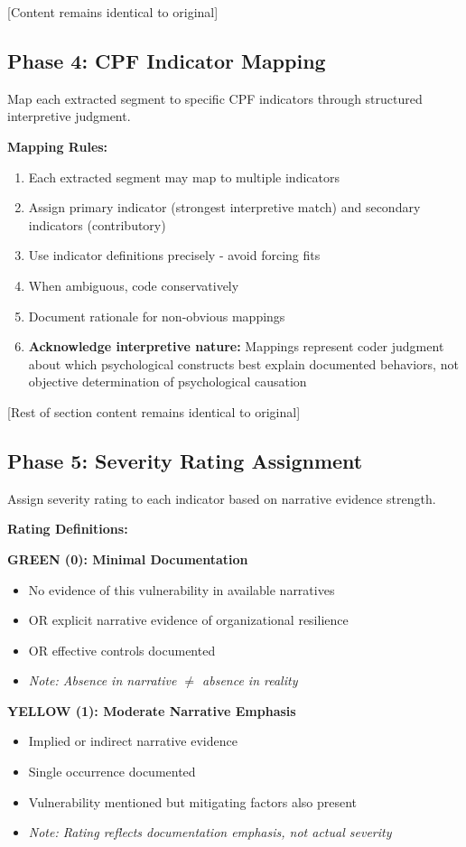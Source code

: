 \documentclass[11pt,a4paper]{article}
\begin{document}
[Content remains identical to original]

\subsection{Phase 4: CPF Indicator Mapping}

Map each extracted segment to specific CPF indicators through structured interpretive judgment.

\textbf{Mapping Rules:}

\begin{enumerate}
\item Each extracted segment may map to multiple indicators
\item Assign primary indicator (strongest interpretive match) and secondary indicators (contributory)
\item Use indicator definitions precisely - avoid forcing fits
\item When ambiguous, code conservatively
\item Document rationale for non-obvious mappings
\item \textbf{Acknowledge interpretive nature:} Mappings represent coder judgment about which psychological constructs best explain documented behaviors, not objective determination of psychological causation
\end{enumerate}

[Rest of section content remains identical to original]

\subsection{Phase 5: Severity Rating Assignment}

Assign severity rating to each indicator based on narrative evidence strength.

\textbf{Rating Definitions:}

\textbf{GREEN (0): Minimal Documentation}
\begin{itemize}
\item No evidence of this vulnerability in available narratives
\item OR explicit narrative evidence of organizational resilience
\item OR effective controls documented
\item \textit{Note: Absence in narrative $\neq$ absence in reality}
\end{itemize}

\textbf{YELLOW (1): Moderate Narrative Emphasis}
\begin{itemize}
\item Implied or indirect narrative evidence
\item Single occurrence documented
\item Vulnerability mentioned but mitigating factors also present
\item \textit{Note: Rating reflects documentation emphasis, not actual severity}
\end{itemize}
\end{document}
